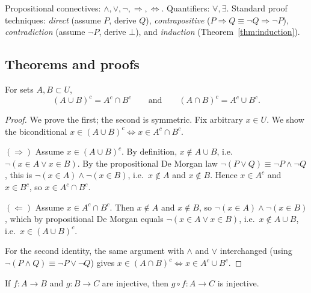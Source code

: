 \begin{remark}[Logic]
Propositional connectives: $\land, \lor, \neg, \Rightarrow, \Leftrightarrow$. Quantifiers: $\forall, \exists$. Standard proof techniques: \emph{direct} (assume $P$, derive $Q$), \emph{contrapositive} ($P \Rightarrow Q \equiv \neg Q \Rightarrow \neg P$), \emph{contradiction} (assume $\neg P$, derive $\bot$), and \emph{induction} (Theorem~\ref{thm:induction}).
\end{remark}

\subsection*{Theorems and proofs}

\begin{theorem}\label{thm:demorgan}
For sets $A, B \subset U$,
\[
(A \cup B)^{c} = A^{c} \cap B^{c}
\qquad\text{and}\qquad
(A \cap B)^{c} = A^{c} \cup B^{c}.
\]
\end{theorem}

\begin{proof}
We prove the first; the second is symmetric. Fix arbitrary $x \in U$. We show the biconditional $x \in (A \cup B)^{c} \Leftrightarrow x \in A^{c} \cap B^{c}$.

\textbf{$(\Rightarrow)$} Assume $x \in (A \cup B)^{c}$. By definition, $x \notin A \cup B$, i.e.\ $\neg(x \in A \lor x \in B)$. By the propositional De Morgan law $\neg(P \lor Q) \equiv \neg P \land \neg Q$, this is $\neg(x \in A) \land \neg(x \in B)$, i.e.\ $x \notin A$ and $x \notin B$. Hence $x \in A^{c}$ and $x \in B^{c}$, so $x \in A^{c} \cap B^{c}$.

\textbf{$(\Leftarrow)$} Assume $x \in A^{c} \cap B^{c}$. Then $x \notin A$ and $x \notin B$, so $\neg(x \in A) \land \neg(x \in B)$, which by propositional De Morgan equals $\neg(x \in A \lor x \in B)$, i.e.\ $x \notin A \cup B$, i.e.\ $x \in (A \cup B)^{c}$.

For the second identity, the same argument with $\land$ and $\lor$ interchanged (using $\neg(P \land Q) \equiv \neg P \lor \neg Q$) gives $x \in (A \cap B)^{c} \Leftrightarrow x \in A^{c} \cup B^{c}$.
\end{proof}

\begin{theorem}\label{thm:compinj}
If $f : A \to B$ and $g : B \to C$ are injective, then $g \circ f : A \to C$ is injective.
\end{theorem}

